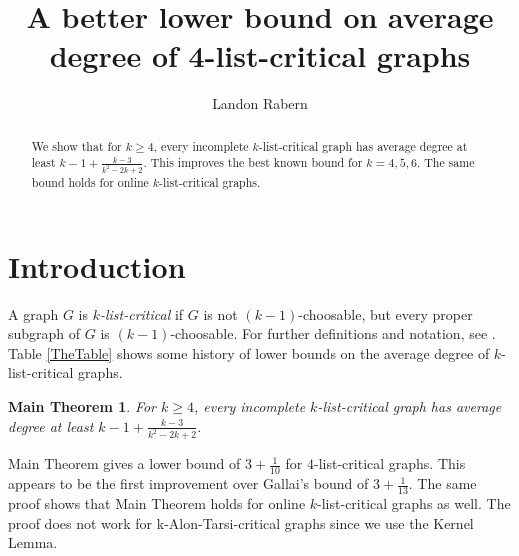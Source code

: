 \documentclass[12pt]{article}
\title{A better lower bound on average degree of 4-list-critical graphs}
\author{Landon Rabern}
\theoremstyle{plain}
\newtheorem*{MainTheorem}{Main Theorem}
\theoremstyle{definition}
\theoremstyle{remark}
\begin{document}
\maketitle
\begin{abstract}
		We show that for $k \ge 4$, every incomplete $k$-list-critical graph has average degree at least $k-1 + \frac{k-3}{k^2-2k+2}$.  This improves the best known bound for $k = 4,5,6$.
		The same bound holds for online $k$-list-critical graphs.
\end{abstract}

\section{Introduction}
A graph $G$ is \emph{$k$-list-critical} if $G$ is not $(k-1)$-choosable, but every
proper subgraph of $G$ is $(k-1)$-choosable.  For further definitions and notation, see \cite{OreVizing, DischargingLowerBound}. 
Table \ref{TheTable} shows some history of lower bounds on the average degree of $k$-list-critical graphs.

\begin{MainTheorem}
	For $k \ge 4$, every incomplete $k$-list-critical graph has average degree at least $k-1 + \frac{k-3}{k^2-2k+2}$.
\end{MainTheorem}

Main Theorem gives a lower bound of $3 + \frac{1}{10}$ for $4$-list-critical graphs. This appears to be the first improvement over Gallai's bound of $3 + \frac{1}{13}$. 
The same proof shows that Main Theorem holds for online $k$-list-critical graphs as well.  The proof does not work for k-Alon-Tarsi-critical graphs since we use the Kernel Lemma.
\end{document}
